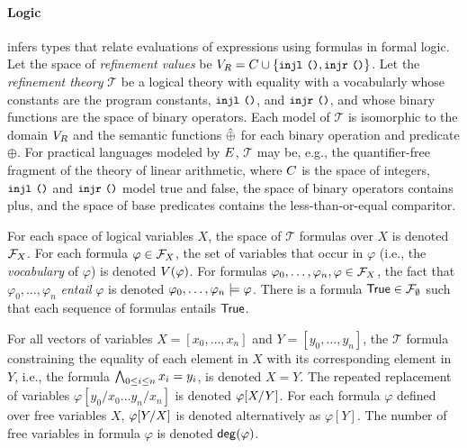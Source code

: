 \paragraph{Logic}
\sys infers types that relate evaluations of expressions using
formulas in formal logic.
%
Let the space of \emph{refinement values} be
$\fovals = \consts \union \elts{ \injl\ \unit, \injr\ \unit }$.
%
Let the \emph{refinement theory} $\mathcal{T}$ be a logical theory
with equality with a vocabularly whose constants are the program
constants, $\injl\ \unit$, and $\injr\ \unit$, and whose binary
functions are the space of binary operators.
%
Each model of $\mathcal{T}$ is isomorphic to the domain $\fovals$ and
the semantic functions $\interp{\oplus}$ for each binary operation and
predicate $\oplus$.
%
For practical languages modeled by $\expr$, $\mathcal{T}$ may be,
e.g., the quantifier-free fragment of the theory of linear arithmetic,
where $\consts$ is the space of integers, $\injl\ \unit$ and
$\injr\ \unit$ model true and false, the space of binary operators
contains plus, and the space of base predicates contains the
less-than-or-equal comparitor.

For each space of logical variables $X$, the space of $\mathcal{T}$
formulas over $X$ is denoted $\formulas{ X }$.
%
For each formula $\varphi \in \formulas{X}$, the set of variables that
occur in $\varphi$ (i.e., the \emph{vocabulary} of $\varphi$) is
denoted $\vocab(\varphi)$.
For formulas $\varphi_0, \ldots, \varphi_n, \varphi \in \formulas{X}$,
the fact that $\varphi_0, \ldots, \varphi_n$ \emph{entail} $\varphi$
is denoted $\varphi_0, \ldots, \varphi_n \entails \varphi$.
%
There is a formula $\true \in \formulas{\emptyset}$ such that each
sequence of formulas entails $\true$.

For all vectors of variables $X = [ x_0, \ldots, x_n ]$ and
$Y = [ y_0, \ldots, y_n ]$, the $\mathcal{T}$ formula constraining the
equality of each element in $X$ with its corresponding element in $Y$,
i.e., the formula $\bigland_{0 \leq i \leq n} x_i = y_i$, is denoted
$X = Y$.
%
The repeated replacement of variables $\varphi[ y_0 / x_0 \ldots y_{n}
/ x_{n} ]$ is denoted $\replace{\varphi}{Y}{X}$.
%
For each formula $\varphi$ defined over free variables $X$,
$\replace{\varphi}{X}{Y}$ is denoted alternatively as $\varphi[Y]$.
%
The number of free variables in formula $\varphi$ is denoted
$\degreeof(\varphi)$.

